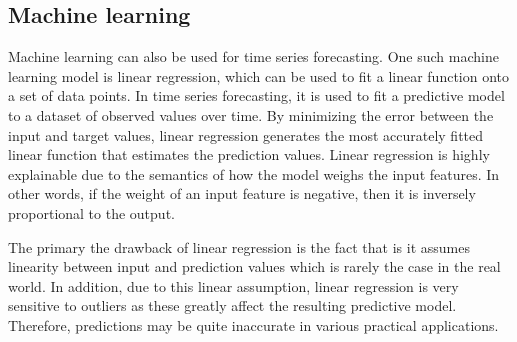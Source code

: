 \subsection{Machine learning}
Machine learning can also be used for time series forecasting. 
One such machine learning model is linear regression, which can be used to fit a linear function onto a set of data points.
In time series forecasting, it is used to fit a predictive model to a dataset of observed values over time.
By minimizing the error between the input and target values, linear regression generates the most accurately fitted linear function that estimates the prediction values.
Linear regression is highly explainable due to the semantics of how the model weighs the input features. 
In other words, if the weight of an input feature is negative, then it is inversely proportional to the output. \cite{pooleArtificialIntelligenceFoundations2017}

The primary the drawback of linear regression is the fact that is it assumes linearity between input and prediction values which is rarely the case in the real world.
In addition, due to this linear assumption, linear regression is very sensitive to outliers as these greatly affect the resulting predictive model.
Therefore, predictions may be quite inaccurate in various practical applications. \cite{kumarProfessionalsPointAdvantages2019}